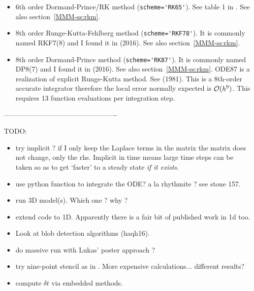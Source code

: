 \begin{itemize}
\item 6th order Dormand-Prince/RK method (\lstinline{scheme='RK65'}).
See table 1 in \textcite{prdo81}.
See also section~\ref{MMM-ss:rkm}.

\item 8th order Runge-Kutta-Fehlberg method (\lstinline{scheme='RKF78'}).
It is commonly named RKF7(8) and I found it in \textcite{bujk16} (2016).
See also section~\ref{MMM-ss:rkm}.

\item 8th order Dormand-Prince method (\lstinline{scheme='RK87'}).
It is commonly named DP8(7) and I found it in \textcite{bujk16} (2016).
See also section~\ref{MMM-ss:rkm}.
ODE87  is a realization of explicit Runge-Kutta method. 
See \textcite{prdo81} (1981).
This is a 8th-order accurate integrator therefore the local error normally
expected is ${\cal O}(h^9)$.  
This requires 13 function evaluations per integration step.
\end{itemize}


-------------------------------------------------

TODO:

\begin{itemize}
\item try implicit ? if I only keep the Laplace terms in the matrix the matrix does not change, only the rhs.
Implicit in time means large time steps can be taken so as to get `faster' to a steady state {\it if it exists}.

\item use python function to integrate the ODE? a la rhythmite ? see stone 157.

\item run 3D model(s). Which one ? why ?

\item extend code to 1D. Apparently there is a fair bit of published work in 1d too.

\item Look at blob detection algorithms (haqh16). 

\item do massive run with Lukas' poster approach ?

\item try nine-point stencil as in \cite{jilw24}. More expensive calculations... different results?

\item compute $\delta t$ via embedded methods.

\end{itemize}


